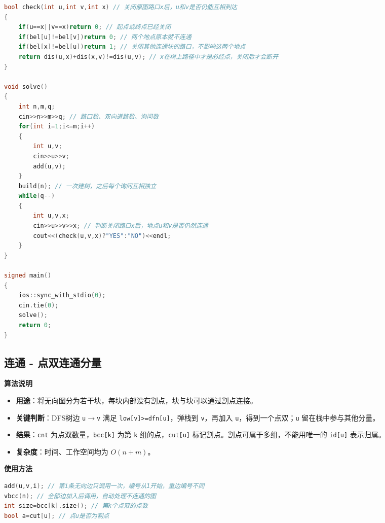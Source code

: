 \documentclass[10pt,landscape,a4paper]{article}
\begin{document}
\begin{multicols*}{3}
\begin{lstlisting}[language=C++]
bool check(int u,int v,int x) // 关闭原图路口x后，u和v是否仍能互相到达
{
    if(u==x||v==x)return 0; // 起点或终点已经关闭
    if(bel[u]!=bel[v])return 0; // 两个地点原本就不连通
    if(bel[x]!=bel[u])return 1; // 关闭其他连通块的路口，不影响这两个地点
    return dis(u,x)+dis(x,v)!=dis(u,v); // x在树上路径中才是必经点，关闭后才会断开
}

void solve()
{
    int n,m,q;
    cin>>n>>m>>q; // 路口数、双向道路数、询问数
    for(int i=1;i<=m;i++)
    {
        int u,v;
        cin>>u>>v;
        add(u,v);
    }
    build(n); // 一次建树，之后每个询问互相独立
    while(q--)
    {
        int u,v,x;
        cin>>u>>v>>x; // 判断关闭路口x后，地点u和v是否仍然连通
        cout<<(check(u,v,x)?"YES":"NO")<<endl;
    }
}

signed main()
{
    ios::sync_with_stdio(0);
    cin.tie(0);
    solve();
    return 0;
}
\end{lstlisting}
\subsection*{连通 - 点双连通分量}
\par\addvspace{0.7ex}\noindent\textbf{算法说明}\par\nobreak
\begin{itemize}
\item \textbf{用途}：将无向图分为若干块，每块内部没有割点，块与块可以通过割点连接。
\item \textbf{关键判断}：DFS树边 \texttt{u\allowbreak{}\ensuremath{\to}\allowbreak{}v} 满足 \texttt{l\allowbreak{}o\allowbreak{}w\allowbreak{}[\allowbreak{}v\allowbreak{}]\allowbreak{}\textgreater{}\allowbreak{}=\allowbreak{}d\allowbreak{}f\allowbreak{}n\allowbreak{}[\allowbreak{}u\allowbreak{}]}，弹栈到 \texttt{v}，再加入 \texttt{u}，得到一个点双；\texttt{u} 留在栈中参与其他分量。
\item \textbf{结果}：\texttt{c\allowbreak{}n\allowbreak{}t} 为点双数量，\texttt{b\allowbreak{}c\allowbreak{}c\allowbreak{}[\allowbreak{}k\allowbreak{}]} 为第 \texttt{k} 组的点，\texttt{c\allowbreak{}u\allowbreak{}t\allowbreak{}[\allowbreak{}u\allowbreak{}]} 标记割点。割点可属于多组，不能用唯一的 \texttt{i\allowbreak{}d\allowbreak{}[\allowbreak{}u\allowbreak{}]} 表示归属。
\item \textbf{复杂度}：时间、工作空间均为 $O(n+m)$。
\end{itemize}
\par\addvspace{0.7ex}\noindent\textbf{使用方法}\par\nobreak
\begin{lstlisting}[language=C++,numbers=none,basicstyle=\footnotesize\ttfamily]
add(u,v,i); // 第i条无向边只调用一次，编号从1开始，重边编号不同
vbcc(n); // 全部边加入后调用，自动处理不连通的图
int size=bcc[k].size(); // 第k个点双的点数
bool a=cut[u]; // 点u是否为割点
\end{lstlisting}


\end{multicols*}
\end{document}

